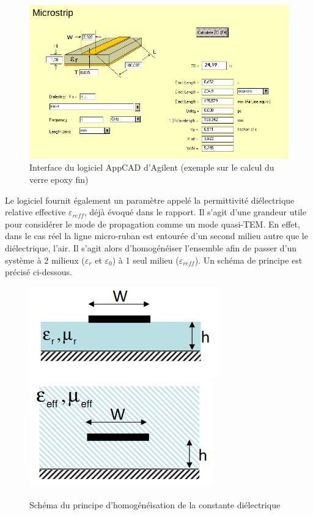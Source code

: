 \documentclass[french]{article}
\begin{document}
\begin{figure}[H]
	\centering
	\includegraphics[scale=0.4]{../2carac/caract_large_bande/interface_AppCAD.png}
	\caption{Interface du logiciel AppCAD d'Agilent (exemple sur le calcul du verre epoxy fin)}
	\label{fig:interface_appcad}
\end{figure}




Le logiciel fournit également un paramètre appelé la permittivité diélectrique relative effective $\varepsilon_{reff}$, déjà évoqué dans le rapport. Il s'agit d'une grandeur utile pour considérer le mode de propagation comme un mode quasi-TEM. En effet, dans le cas réel la ligne micro-ruban est entourée d'un second milieu autre que le diélectrique, l'air. Il s'agit alors d'homogénéiser l'ensemble afin de passer d'un système à 2 milieux ($\varepsilon_r$ et $\varepsilon_0$) à 1 seul milieu ($\varepsilon_{reff}$). Un schéma de principe est précisé ci-dessous.

\begin{figure}[H]
	\centering
	\includegraphics[scale=0.4]{../2carac/caract_large_bande/image_1_non_homogene.png}
	\includegraphics[scale=0.4]{../2carac/caract_large_bande/image_2_homogene.png}
	\caption{Schéma du principe d'homogénéisation de la constante diélectrique}
	\label{fig:homogeneisation_epsilon_reff}
\end{figure}
\end{document}
